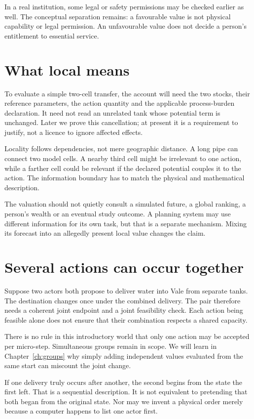 In a real institution, some legal or safety permissions may be checked earlier as well. The conceptual separation remains: a favourable value is not physical capability or legal permission. An unfavourable value does not decide a person's entitlement to essential service.

\section{What local means}
To evaluate a simple two-cell transfer, the account will need the two stocks, their reference parameters, the action quantity and the applicable process-burden declaration. It need not read an unrelated tank whose potential term is unchanged. Later we prove this cancellation; at present it is a requirement to justify, not a licence to ignore affected effects.

Locality follows dependencies, not mere geographic distance. A long pipe can connect two model cells. A nearby third cell might be irrelevant to one action, while a farther cell could be relevant if the declared potential couples it to the action. The information boundary has to match the physical and mathematical description.

The valuation should not quietly consult a simulated future, a global ranking, a person's wealth or an eventual study outcome. A planning system may use different information for its own task, but that is a separate mechanism. Mixing its forecast into an allegedly present local value changes the claim.

\section{Several actions can occur together}
Suppose two actors both propose to deliver water into Vale from separate tanks. The destination changes once under the combined delivery. The pair therefore needs a coherent joint endpoint and a joint feasibility check. Each action being feasible alone does not ensure that their combination respects a shared capacity.

There is no rule in this introductory world that only one action may be accepted per micro-step. Simultaneous groups remain in scope. We will learn in Chapter~\ref{ch:groups} why simply adding independent values evaluated from the same start can miscount the joint change.

If one delivery truly occurs after another, the second begins from the state the first left. That is a sequential description. It is not equivalent to pretending that both began from the original state. Nor may we invent a physical order merely because a computer happens to list one actor first.

